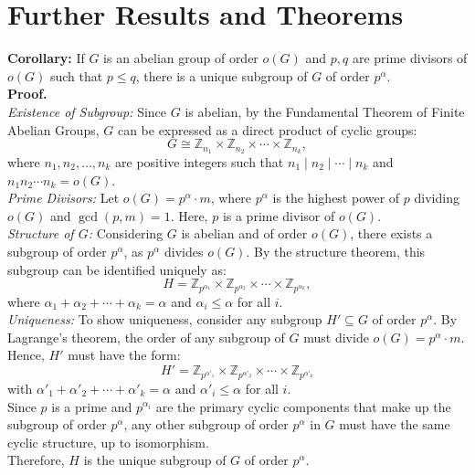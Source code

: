 \section{Further Results and Theorems}
\textbf{Corollary:} If \( G \) is an abelian group of order \( o(G) \) and \( p, q \) are prime divisors of \( o(G) \) such that \( p \leq q \), there is a unique subgroup of \( G \) of order \( p^\alpha \).
\\
\textbf{Proof.}
\\
\textit{Existence of Subgroup:} Since \( G \) is abelian, by the Fundamental Theorem of Finite Abelian Groups, \( G \) can be expressed as a direct product of cyclic groups:
  \[ G \cong \mathbb{Z}_{n_1} \times \mathbb{Z}_{n_2} \times \cdots \times \mathbb{Z}_{n_k}, \]
  where \( n_1, n_2, \ldots, n_k \) are positive integers such that \( n_1 \mid n_2 \mid \cdots \mid n_k \) and \( n_1 n_2 \cdots n_k = o(G) \).
\\
\textit{Prime Divisors:} Let \( o(G) = p^\alpha \cdot m \), where \( p^\alpha \) is the highest power of \( p \) dividing \( o(G) \) and \( \gcd(p, m) = 1 \). Here, \( p \) is a prime divisor of \( o(G) \).
\\
\textit{Structure of \( G \):} Considering \( G \) is abelian and of order \( o(G) \), there exists a subgroup of order \( p^\alpha \), as \( p^\alpha \) divides \( o(G) \). By the structure theorem, this subgroup can be identified uniquely as:
  \[ H = \mathbb{Z}_{p^{\alpha_1}} \times \mathbb{Z}_{p^{\alpha_2}} \times \cdots \times \mathbb{Z}_{p^{\alpha_k}}, \]
  where \( \alpha_1 + \alpha_2 + \cdots + \alpha_k = \alpha \) and \( \alpha_i \leq \alpha \) for all \( i \).
\\
\textit{Uniqueness:} To show uniqueness, consider any subgroup \( H' \subseteq G \) of order \( p^\alpha \). By Lagrange's theorem, the order of any subgroup of \( G \) must divide \( o(G) = p^\alpha \cdot m \). Hence, \( H' \) must have the form:
  \[ H' = \mathbb{Z}_{p^{\alpha'_1}} \times \mathbb{Z}_{p^{\alpha'_2}} \times \cdots \times \mathbb{Z}_{p^{\alpha'_k}} \]
  with \( \alpha'_1 + \alpha'_2 + \cdots + \alpha'_k = \alpha \) and \( \alpha'_i \leq \alpha \) for all \( i \).
\\
  Since \( p \) is a prime and \( p^{\alpha_i} \) are the primary cyclic components that make up the subgroup of order \( p^\alpha \), any other subgroup of order \( p^\alpha \) in \( G \) must have the same cyclic structure, up to isomorphism.
\\
Therefore, \( H \) is the unique subgroup of \( G \) of order \( p^\alpha \).
